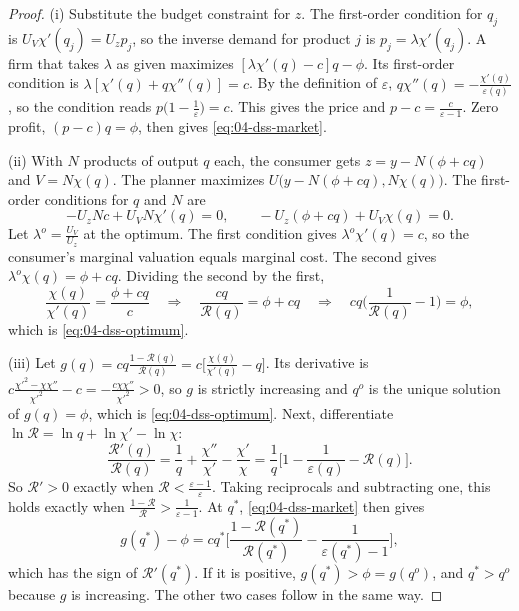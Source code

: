 \begin{proof}
(i) Substitute the budget constraint for $z$. The first-order condition for $q_j$ is $U_V\chi'(q_j) = U_zp_j$, so the
inverse demand for product $j$ is $p_j = \lambda\chi'(q_j)$. A firm that takes $\lambda$ as given maximizes
$[\lambda\chi'(q) - c]q - \phi$. Its first-order condition is $\lambda[\chi'(q) + q\chi''(q)] = c$. By the definition
of $\varepsilon$, $q\chi''(q) = -\frac{\chi'(q)}{\varepsilon(q)}$, so the condition reads
$p\big(1 - \frac{1}{\varepsilon}\big) = c$. This gives the price and $p - c = \frac{c}{\varepsilon - 1}$. Zero profit,
$(p - c)q = \phi$, then gives \eqref{eq:04-dss-market}.

(ii) With $N$ products of output $q$ each, the consumer gets $z = y - N(\phi + cq)$ and $V = N\chi(q)$. The planner
maximizes $U\big(y - N(\phi + cq), N\chi(q)\big)$. The first-order conditions for $q$ and $N$ are
\begin{equation*}
-U_zNc + U_VN\chi'(q) = 0, \qquad -U_z(\phi + cq) + U_V\chi(q) = 0 .
\end{equation*}
Let $\lambda^o = \frac{U_V}{U_z}$ at the optimum. The first condition gives $\lambda^o\chi'(q) = c$, so the consumer's
marginal valuation equals marginal cost. The second gives $\lambda^o\chi(q) = \phi + cq$. Dividing the second by the
first,
\begin{equation*}
\frac{\chi(q)}{\chi'(q)} = \frac{\phi + cq}{c}
\quad\Longrightarrow\quad
\frac{cq}{\mathcal{R}(q)} = \phi + cq
\quad\Longrightarrow\quad
cq\Big(\frac{1}{\mathcal{R}(q)} - 1\Big) = \phi ,
\end{equation*}
which is \eqref{eq:04-dss-optimum}.

(iii) Let $g(q) = cq\frac{1 - \mathcal{R}(q)}{\mathcal{R}(q)} = c\big[\frac{\chi(q)}{\chi'(q)} - q\big]$. Its derivative is
$c\frac{\chi'^2 - \chi\chi''}{\chi'^2} - c = -\frac{c\chi\chi''}{\chi'^2} > 0$, so $g$ is strictly increasing and $q^o$ is
the unique solution of $g(q) = \phi$, which is \eqref{eq:04-dss-optimum}. Next, differentiate $\ln\mathcal{R} = \ln q + \ln\chi' - \ln\chi$:
\begin{equation*}
\frac{\mathcal{R}'(q)}{\mathcal{R}(q)} = \frac{1}{q} + \frac{\chi''}{\chi'} - \frac{\chi'}{\chi}
= \frac{1}{q}\Big[1 - \frac{1}{\varepsilon(q)} - \mathcal{R}(q)\Big] .
\end{equation*}
So $\mathcal{R}' > 0$ exactly when $\mathcal{R} < \frac{\varepsilon - 1}{\varepsilon}$. Taking reciprocals and
subtracting one, this holds exactly when $\frac{1 - \mathcal{R}}{\mathcal{R}} > \frac{1}{\varepsilon - 1}$. At $q^*$,
\eqref{eq:04-dss-market} then gives
\begin{equation*}
g(q^*) - \phi = cq^*\Big[\frac{1 - \mathcal{R}(q^*)}{\mathcal{R}(q^*)} - \frac{1}{\varepsilon(q^*) - 1}\Big],
\end{equation*}
which has the sign of $\mathcal{R}'(q^*)$. If it is positive, $g(q^*) > \phi = g(q^o)$, and $q^* > q^o$ because $g$
is increasing. The other two cases follow in the same way.


\end{proof}
